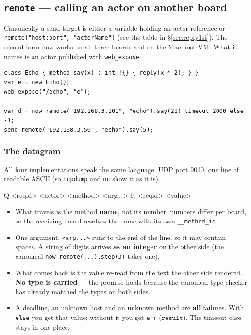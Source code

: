 \documentclass[11pt,a4paper]{article}
\newcommand{\ty}[1]{\ensuremath{\mathtt{#1}}}
\begin{document}
\subsection{\texttt{remote} --- calling an actor on another board}
\label{sec:xinu-remote}

Canonically a send target is either a variable holding an actor reference or
\texttt{remote("host:port", "actorName")} (see the table in
\S\ref{sec:reply1st}). The second form now works on all three boards and on the
Mac host VM. What it names is an actor published with \texttt{web\_expose}.

\begin{lstlisting}
class Echo { method say(x) : int !{} { reply(x * 2); } }
var e = new Echo();
web_expose("/echo", "e");

var d = now remote("192.168.3.101", "echo").say(21) timeout 2000 else -1;
send remote("192.168.3.50", "echo").say(5);
\end{lstlisting}

\subsubsection*{The datagram}

All four implementations speak the same language: UDP port 9010, one line of
readable ASCII (so \texttt{tcpdump} and \texttt{nc} show it as it is).

\begin{term}
Q <reqid> <actor> <method> <arg...>
R <reqid> <value>
\end{term}

\begin{itemize}
\item What travels is the method \textbf{name}, not its number: numbers differ
  per board, so the receiving board resolves the name with its own
  \texttt{\_\_method\_id}.
\item One argument. \texttt{<arg...>} runs to the end of the line, so it may
  contain spaces. A string of digits arrives \textbf{as an integer} on the other
  side (the canonical \texttt{now remote(...).step(3)} takes one).
\item What comes back is the value re-read from the text the other side
  rendered. \textbf{No type is carried} --- the promise holds because the
  canonical type checker has already matched the types on both sides.
\item A deadline, an unknown host and an unknown method are \textbf{all}
  failures. With \texttt{else} you get that value; without it you get
  \texttt{err} (\ty{result}). The timeout case stays in one place.
\end{itemize}
\end{document}
